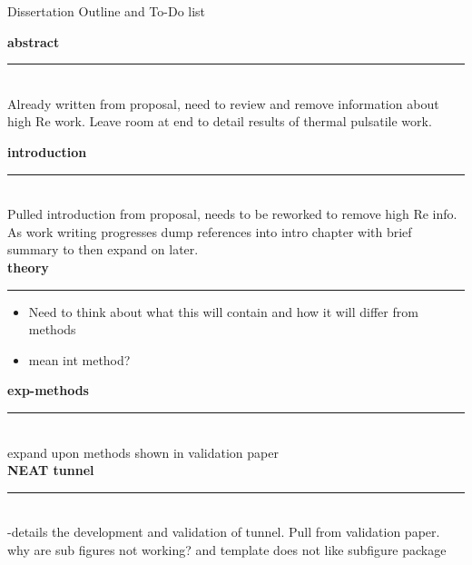 \documentclass[11pt]{article}
\begin{document}
\begin{center}
Dissertation Outline and To-Do list\\
\end{center}

{\bf abstract}
\vspace{-.5cm}
\newline
\noindent\rule{8cm}{0.4pt}\\
Already written from proposal, need to review and remove information about high Re work.
Leave room at end to detail results of thermal pulsatile work.\\
\vspace{.5cm}


{\bf introduction}
\vspace{-.5cm}
\newline
\noindent\rule{8cm}{0.4pt}\\
Pulled introduction from proposal, needs to be reworked to remove high Re info.
As work writing progresses dump references into intro chapter with brief summary to then expand on later.\\


{\bf theory}
\vspace{-.5cm}
\newline
\noindent\rule{8cm}{0.4pt}
\begin{itemize}
\item Need to think about what this will contain and how it will differ from methods
\item mean int method?
\end{itemize}



{\bf exp-methods}
\vspace{-.5cm}
\newline
\noindent\rule{8cm}{0.4pt}\\
expand upon methods shown in validation paper\\



{\bf NEAT tunnel}
\vspace{-.5cm}
\newline
\noindent\rule{8cm}{0.4pt}\\
-details the development and validation of tunnel.
Pull from validation paper.\\
why are sub figures not working? and template does not like subfigure package
\end{document}
